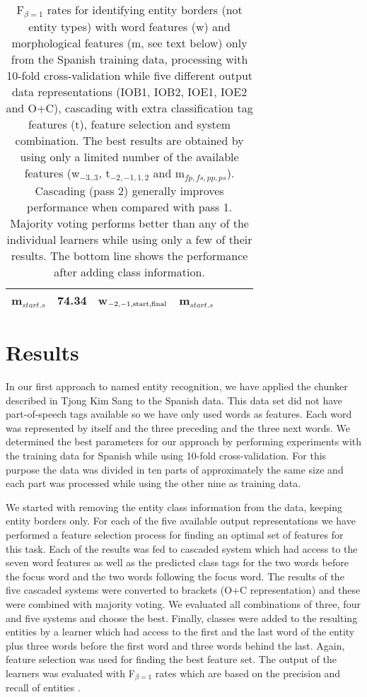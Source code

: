 \documentclass[11pt]{article}
\begin{document}
\begin{table*}[t]
\begin{center}
\begin{tabular}{|l|c|ll|c|lll|}
                          m$_{start.s}$
                & 74.34 & \multicolumn{2}{l}{w$_{{\rm -2,-1,start,final}}$}
                        & m$_{start.s}$\\\hline
\end{tabular}
\label{tab-wordsandmorph}
\caption{
F$_{\beta=1}$ rates for identifying entity borders (not entity types)
with word features (w) and morphological features (m, see text below)
only from the Spanish training data, processing with 10-fold
cross-validation while five different output data representations
(IOB1, IOB2, IOE1, IOE2 and O+C), cascading with extra classification
tag features (t), feature selection and system combination. 
The best results are obtained by using only a limited number of the
available features (w$_{-3..3}$, t$_{-2,-1,1,2}$ and
m$_{fp,fs,pp,ps}$). 
Cascading (pass 2) generally improves performance when compared
with pass 1.
Majority voting performs better than any of the individual learners
while using only a few of their results.
The bottom line shows the performance after adding class information.
}
\end{center}
\end{table*}

\section{Results}

In our first approach to named entity recognition, we have applied
the chunker described in Tjong Kim Sang  to the
Spanish data.
This data set did not have part-of-speech tags available so we have
only used words as features.
Each word was represented by itself and the three preceding and the
three next words.
We determined the best parameters for our approach by performing
experiments with the training data for Spanish while using 10-fold
cross-validation.
For this purpose the data was divided in ten parts of approximately
the same size and each part was processed while using the other nine
as training data.

We started with removing the entity class information from the data,
keeping entity borders only.
For each of the five available output representations we have
performed a feature selection process for finding an optimal set
of features for this task.
Each of the results was fed to cascaded system which had access to the
seven word features as well as the predicted class tags for the two
words before the focus word and the two words following the focus
word.
The results of the five cascaded systems were converted to brackets
(O+C representation) and these were combined with majority voting.
We evaluated all combinations of three, four and five systems and
choose the best.
Finally, classes were added to the resulting entities by a learner
which had access to the first and the last word of the entity plus
three words before the first word and three words behind the last.
Again, feature selection was used for finding the best feature set.
The output of the learners was evaluated with F$_{\beta=1}$ rates
which are based on the precision and recall of entities
\cite{vanrijsbergen75}.
\end{document}
